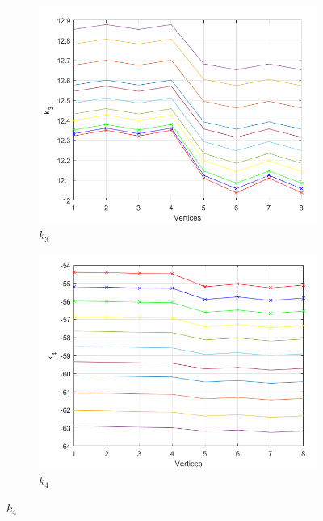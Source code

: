 \documentclass[a4paper,10pt]{article}
\begin{document}
\begin{figure}[H]
	\centering
	\begin{subfigure}[b]{0.3\textwidth}
		\centering
		\includegraphics[scale=0.7]{fig/pdchmuk3}
		\caption{$k_3$}
	\end{subfigure}
	\hfill
	\begin{subfigure}[b]{0.45\textwidth}
		\centering
		\includegraphics[scale=0.7]{fig/pdchmuk4}
		\caption{$k_4$}
	\end{subfigure}
\end{figure}
\end{document}
